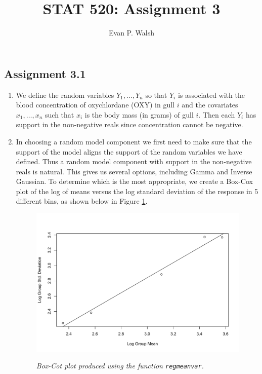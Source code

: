 \documentclass[12pt]{article}
\title{STAT 520: Assignment 3}
\author{Evan P. Walsh}
\begin{document}


\subsection*{Assignment 3.1}

\begin{enumerate}
  \item We define the random variables $Y_{1}, \dots, Y_{n}$ so that $Y_i$ is associated with the blood concentration of oxychlordane (OXY) in gull
    $i$ and the covariates $x_{1}, \dots, x_{n}$ such that $x_{i}$ is the body mass (in grams) of gull $i$. Then each $Y_{i}$ has support in the non-negative
    reals since concentration cannot be negative.

  \item In choosing a random model component we first need to make sure that the support of the model aligns the support of the random variables we
    have defined. Thus a random model component with support in the non-negative reals is natural. This gives us several options, including Gamma and
    Inverse Gaussian. To determine which is the most appropriate, we 
    create a Box-Cox plot of the log of means 
    versus the log standard deviation of the response in 5 different bins, as shown below in Figure \ref{fig:1}.

    \begin{figure}[h]
      \caption{\emph{Box-Cot plot produced using the function \texttt{regmeanvar}.}}
      \centering
      \includegraphics[width=.82\textwidth]{./figures/hw03_regmeanvar.pdf}
      \label{fig:1}
    \end{figure}


\end{enumerate}
\end{document}
